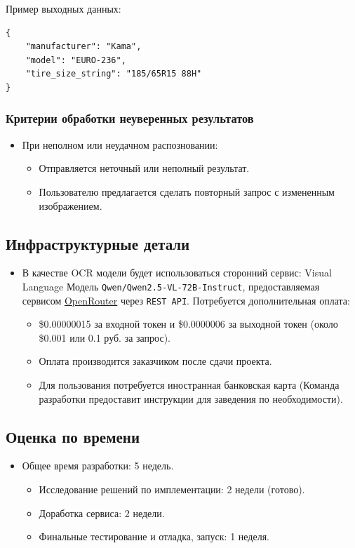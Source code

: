 \documentclass[12pt]{article}
\begin{document}
Пример выходных данных:
\begin{verbatim}
{
	"manufacturer": "Kama",
	"model": "EURO-236",
	"tire_size_string": "185/65R15 88H"
}
\end{verbatim}


\subsubsection{Критерии обработки неуверенных результатов}
\begin{itemize}
	\item При неполном или неудачном распозновании:
	      \begin{itemize}
		      \item Отправляется неточный или неполный результат.
		      \item Пользователю предлагается сделать повторный запрос с измененным изображением.
	      \end{itemize}
\end{itemize}


\subsection{Инфраструктурные детали}
\begin{itemize}
	\item В качестве OCR модели будет использоваться сторонний сервис: Visual Language Модель \texttt{Qwen/Qwen2.5-VL-72B-Instruct}, предоставляемая сервисом \href{https://openrouter.ai/}{OpenRouter} через \texttt{REST API}. Потребуется дополнительная оплата:
	      \begin{itemize}
		      \item \$0.00000015 за входной токен и \$0.0000006 за выходной токен (около \$0.001 или 0.1 руб. за запрос).
		      \item Оплата производится заказчиком после сдачи проекта.
		      \item Для пользования потребуется иностранная банковская карта (Команда разработки предоставит инструкции для заведения по необходимости).
	      \end{itemize}
\end{itemize}


\subsection{Оценка по времени}
\begin{itemize}
	\item Общее время разработки: 5 недель.
	      \begin{itemize}
		      \item Исследование решений по имплементации: 2 недели (готово).
		      \item Доработка сервиса: 2 недели.
		      \item Финальные тестирование и отладка, запуск: 1 неделя.
	      \end{itemize}
\end{itemize}
\end{document}
